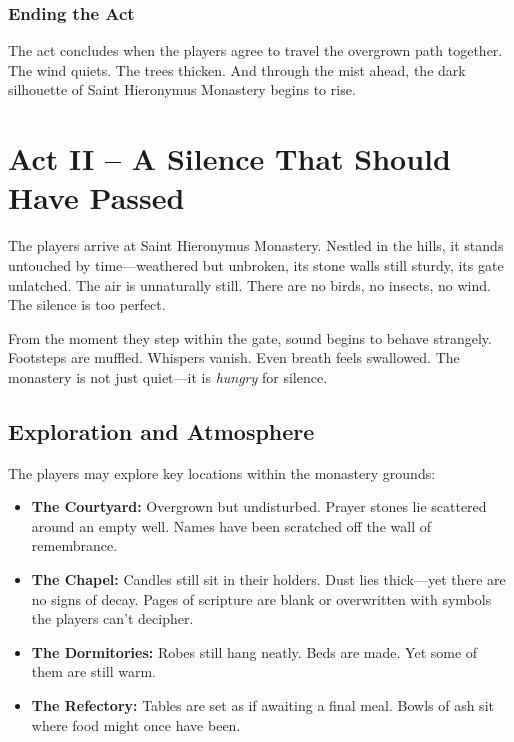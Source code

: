 \documentclass[nodeprecatedcode,bg=print]{dndbook/dndbook}
\begin{document}
\subsubsection{Ending the Act} The act concludes when the players agree to travel the overgrown path together. The wind quiets. The trees thicken. And through the mist ahead, the dark silhouette of Saint Hieronymus Monastery begins to rise.


\section*{Act II – A Silence That Should Have Passed}

The players arrive at Saint Hieronymus Monastery. Nestled in the hills, it stands untouched by time—weathered but unbroken, its stone walls still sturdy, its gate unlatched. The air is unnaturally still. There are no birds, no insects, no wind. The silence is too perfect.

From the moment they step within the gate, sound begins to behave strangely. Footsteps are muffled. Whispers vanish. Even breath feels swallowed. The monastery is not just quiet—it is \emph{hungry} for silence.


\subsection{Exploration and Atmosphere}

The players may explore key locations within the monastery grounds:
\begin{WyrdExample}[Locations]
\begin{itemize}
    \item \textbf{The Courtyard:} Overgrown but undisturbed. Prayer stones lie scattered around an empty well. Names have been scratched off the wall of remembrance.
    \item \textbf{The Chapel:} Candles still sit in their holders. Dust lies thick—yet there are no signs of decay. Pages of scripture are blank or overwritten with symbols the players can’t decipher.
    \item \textbf{The Dormitories:} Robes still hang neatly. Beds are made. Yet some of them are still warm.
    \item \textbf{The Refectory:} Tables are set as if awaiting a final meal. Bowls of ash sit where food might once have been.
\end{itemize}
\end{WyrdExample}
\end{document}
